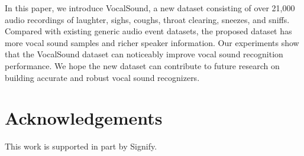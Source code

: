 \documentclass{article}
\newcommand{\squeezeup}{\vspace{-1.6mm}}
\begin{document}
In this paper, we introduce VocalSound, a new dataset consisting of over 21,000 audio recordings of laughter, sighs, coughs, throat clearing, sneezes, and sniffs. Compared with existing generic audio event datasets, the proposed dataset has more vocal sound samples and richer speaker information. Our experiments show that the VocalSound dataset can noticeably improve vocal sound recognition performance. We hope the new dataset can contribute to future research on building accurate and robust vocal sound recognizers.

\squeezeup\squeezeup
\section{Acknowledgements}
\squeezeup\squeezeup

This work is supported in part by Signify.



\end{document}
